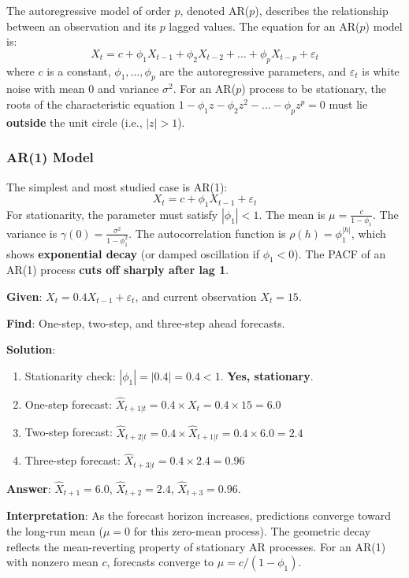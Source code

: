 \documentclass[11pt,a4paper]{article}
\begin{document}
The autoregressive model of order $p$, denoted AR($p$), describes the relationship between an observation and its $p$ lagged values. The equation for an AR($p$) model is:
\[
X_t = c + \phi_1 X_{t-1} + \phi_2 X_{t-2} + \ldots + \phi_p X_{t-p} + \varepsilon_t
\]
where $c$ is a constant, $\phi_1, \ldots, \phi_p$ are the autoregressive parameters, and $\varepsilon_t$ is white noise with mean 0 and variance $\sigma^2$. For an AR($p$) process to be stationary, the roots of the characteristic equation $1 - \phi_1 z - \phi_2 z^2 - \ldots - \phi_p z^p = 0$ must lie \textbf{outside} the unit circle (i.e., $|z| > 1$).

\subsubsection{AR(1) Model}

The simplest and most studied case is AR(1):
\[
X_t = c + \phi_1 X_{t-1} + \varepsilon_t
\]
For stationarity, the parameter must satisfy $|\phi_1| < 1$. The mean is $\mu = \frac{c}{1 - \phi_1}$. The variance is $\gamma(0) = \frac{\sigma^2}{1 - \phi_1^2}$. The autocorrelation function is $\rho(h) = \phi_1^{|h|}$, which shows \textbf{exponential decay} (or damped oscillation if $\phi_1 < 0$). The PACF of an AR(1) process \textbf{cuts off sharply after lag 1}.

\begin{tcolorbox}[colback=blue!5!white,colframe=blue!75!black,title=\textbf{Worked Example 1: AR(1) Forecasting}]
\textbf{Given}: $X_t = 0.4 X_{t-1} + \varepsilon_t$, and current observation $X_t = 15$.

\textbf{Find}: One-step, two-step, and three-step ahead forecasts.

\textbf{Solution}:
\begin{enumerate}
    \item Stationarity check: $|\phi_1| = |0.4| = 0.4 < 1$. \textbf{Yes, stationary}.
    \item One-step forecast: $\hat{X}_{t+1|t} = 0.4 \times X_t = 0.4 \times 15 = 6.0$
    \item Two-step forecast: $\hat{X}_{t+2|t} = 0.4 \times \hat{X}_{t+1|t} = 0.4 \times 6.0 = 2.4$
    \item Three-step forecast: $\hat{X}_{t+3|t} = 0.4 \times 2.4 = 0.96$
\end{enumerate}
\textbf{Answer}: $\hat{X}_{t+1} = 6.0$, $\hat{X}_{t+2} = 2.4$, $\hat{X}_{t+3} = 0.96$.

\textbf{Interpretation}: As the forecast horizon increases, predictions converge toward the long-run mean ($\mu = 0$ for this zero-mean process). The geometric decay reflects the mean-reverting property of stationary AR processes. For an AR(1) with nonzero mean $c$, forecasts converge to $\mu = c/(1-\phi_1)$.
\end{tcolorbox}
\end{document}
